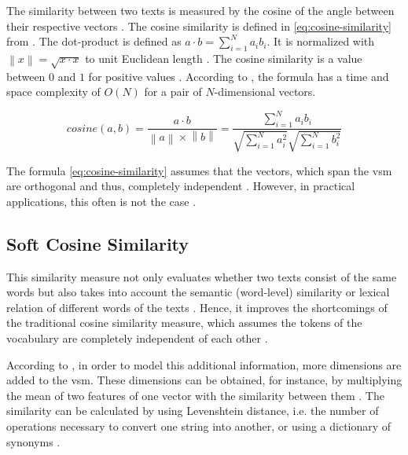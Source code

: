 The similarity between two texts is measured by the cosine of the angle between their respective vectors \cite{soft_cosine2014}.
The cosine similarity is defined in \autoref{eq:cosine-similarity} from \cite{soft_cosine2014}.
The dot-product is defined as $a \cdot b = \sum_{i=1}^{N}a_{i}b_{i}$.
It is normalized with $\left\| x \right\| = \sqrt{x \cdot x}$ to unit Euclidean length \cite{soft_cosine2014}.
The cosine similarity is a value between $0$ and $1$ for positive values \cite{soft_cosine2014}.
According to \citeauthor{soft_cosine2014}, the formula has a time and space complexity of $O(N)$ for a pair of $N$-dimensional vectors.

\begin{equation}
    cosine(a,b) = \frac{a \cdot b}{\left\| a \right\| \times \left\| b \right\|} = \frac{\sum_{i=1}^{N}a_{i}b_{i}}{\sqrt{\sum_{i=1}^{N}{a}^2_{i}}\sqrt{\sum_{i=1}^{N}{b}^2_{i}}}
    \label{eq:cosine-similarity}
\end{equation}

The formula \autoref{eq:cosine-similarity} assumes that the vectors, which span the \ac{vsm} are orthogonal and thus, 
completely independent \cite{soft_cosine2014}.
However, in practical applications, this often is not the case \cite{soft_cosine2014}.


\subsection{Soft Cosine Similarity}\label{subsec:soft-cosine-similarity}

This similarity measure not only evaluates whether two texts consist of the same words but 
also takes into account the semantic (word-level) similarity or lexical relation of different words of the texts \cite{soft_cosine2017}.
Hence, it improves the shortcomings of the traditional cosine similarity measure, 
which assumes the tokens of the vocabulary are completely independent of each other \cite{soft_cosine2014}.

According to \citeauthor{soft_cosine2014}, in order to model this additional information, more dimensions are added to the \ac{vsm}.
These dimensions can be obtained, for instance, by multiplying the mean of two features of one vector with the similarity between them \cite{soft_cosine2014}.
The similarity can be calculated by using Levenshtein distance, i.e. the number of operations necessary to convert one string into another, 
or using a dictionary of synonyms \cite{soft_cosine2014}.

